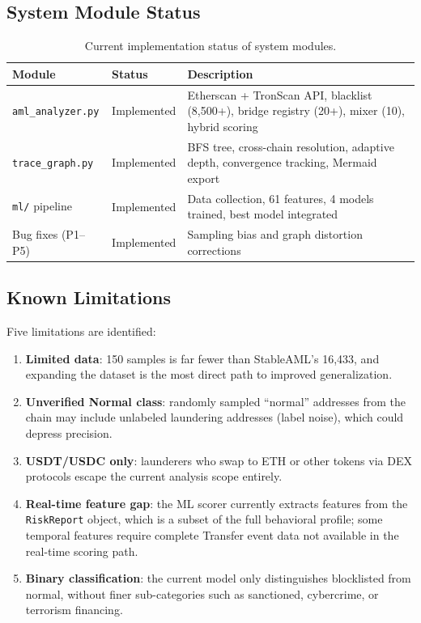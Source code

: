 \documentclass[12pt,a4paper]{article}
\begin{document}
\subsection{System Module Status}

\begin{table}[htbp]
\centering
\caption{Current implementation status of system modules.}
\label{tab:module_status}
\small
\begin{tabularx}{\textwidth}{l l X}
\toprule
\textbf{Module} & \textbf{Status} & \textbf{Description} \\
\midrule
\texttt{aml\_analyzer.py} & Implemented & Etherscan + TronScan API, blacklist (8,500+), bridge registry (20+), mixer (10), hybrid scoring \\
\texttt{trace\_graph.py} & Implemented & BFS tree, cross-chain resolution, adaptive depth, convergence tracking, Mermaid export \\
\texttt{ml/} pipeline & Implemented & Data collection, 61 features, 4 models trained, best model integrated \\
Bug fixes (P1--P5) & Implemented & Sampling bias and graph distortion corrections \\
\bottomrule
\end{tabularx}
\end{table}

\subsection{Known Limitations}

Five limitations are identified:
\begin{enumerate}
    \item \textbf{Limited data}: 150 samples is far fewer than StableAML's 16,433, and expanding the dataset is the most direct path to improved generalization.
    \item \textbf{Unverified Normal class}: randomly sampled ``normal'' addresses from the chain may include unlabeled laundering addresses (label noise), which could depress precision.
    \item \textbf{USDT/USDC only}: launderers who swap to ETH or other tokens via DEX protocols escape the current analysis scope entirely.
    \item \textbf{Real-time feature gap}: the ML scorer currently extracts features from the \texttt{RiskReport} object, which is a subset of the full behavioral profile; some temporal features require complete Transfer event data not available in the real-time scoring path.
    \item \textbf{Binary classification}: the current model only distinguishes blocklisted from normal, without finer sub-categories such as sanctioned, cybercrime, or terrorism financing.
\end{enumerate}
\end{document}
